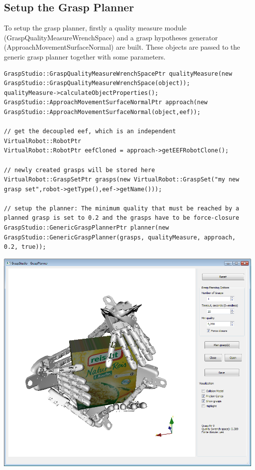 \subsection{Setup the Grasp Planner}
To setup the grasp planner, firstly a quality measure module (GraspQualityMeasureWrenchSpace) and a grasp hypotheses generator (ApproachMovementSurfaceNormal) are built. These objects are passed to the generic grasp planner together with some parameters. 
\begin{lstlisting}
GraspStudio::GraspQualityMeasureWrenchSpacePtr qualityMeasure(new GraspStudio::GraspQualityMeasureWrenchSpace(object));
qualityMeasure->calculateObjectProperties();
GraspStudio::ApproachMovementSurfaceNormalPtr approach(new GraspStudio::ApproachMovementSurfaceNormal(object,eef));

// get the decoupled eef, which is an independent VirtualRobot::RobotPtr
VirtualRobot::RobotPtr eefCloned = approach->getEEFRobotClone();

// newly created grasps will be stored here 
VirtualRobot::GraspSetPtr grasps(new VirtualRobot::GraspSet("my new grasp set",robot->getType(),eef->getName()));

// setup the planner: The minimum quality that must be reached by a planned grasp is set to 0.2 and the grasps have to be force-closure
GraspStudio::GenericGraspPlannerPtr planner(new GraspStudio::GenericGraspPlanner(grasps, qualityMeasure, approach, 0.2, true));
\end{lstlisting}
\includegraphics[width=\textwidth]{GraspPlanner}
